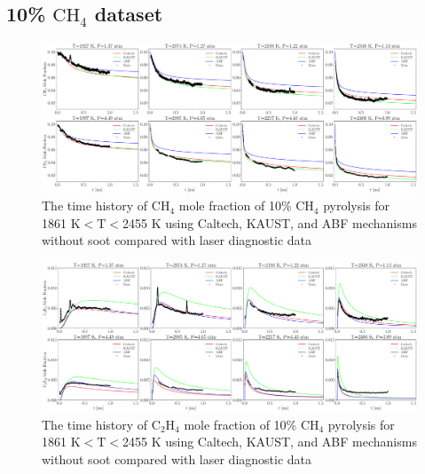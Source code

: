 \subsection{10\% $\mathrm{CH_4}$ dataset}
\label{sec:app_st_10CH4}


\begin{figure}[H]
	\centering
	\includegraphics[width=1\textwidth]{Figures/Results/Shocktube/Stanford/September/10CH4_CH4_mechs_nosoot.pdf}
	\caption{The time history of $\mathrm{CH_4}$ mole fraction of 10\% $\mathrm{CH_4}$ pyrolysis for 1861 K$<\mathrm{T}<$2455 K using Caltech, KAUST, and ABF mechanisms without soot compared with laser diagnostic data}
	\label{fig:shocktubest_10ch4_nosoot_ch4} 
\end{figure}

\begin{figure}[H]
	\centering
	\includegraphics[width=1\textwidth]{Figures/Results/Shocktube/Stanford/September/10CH4_C2H4_mechs_nosoot.pdf}
	\caption{The time history of $\mathrm{C_2H_4}$ mole fraction of 10\% $\mathrm{CH_4}$ pyrolysis for 1861 K$<\mathrm{T}<$2455 K using Caltech, KAUST, and ABF mechanisms without soot compared with laser diagnostic data}
	\label{fig:shocktubest_10ch4_nosoot_c2h4} 
\end{figure}

